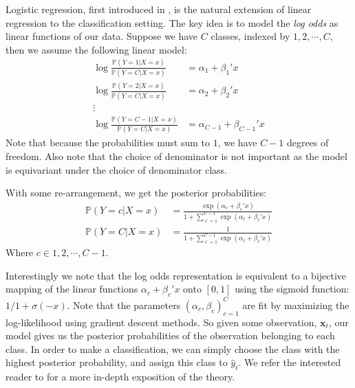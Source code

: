 Logistic regression, first introduced in \cite{COX1958}, is the natural extension of linear regression to the classification setting.
The key idea is to model the \textit{log odds} as linear functions of our data.
Suppose we have $C$ classes, indexed by $1, 2, \cdots, C$, then we assume the following linear model: 
\begin{align*}
    \log \frac{\mathbb{P}(Y=1 | X = x)}{\mathbb{P}(Y=C | X = x)} &= \alpha_1 + \beta_1' x \\
   \log \frac{\mathbb{P}(Y=2 | X = x)}{\mathbb{P}(Y=C | X = x)} &= \alpha_2 + \beta_2' x \\
   \vdots \\
   \log \frac{\mathbb{P}(Y=C-1 | X = x)}{\mathbb{P}(Y=C | X = x)} &= \alpha_{C-1} + \beta_{C-1}' x
\end{align*}
Note that because the probabilities must sum to $1$, we have $C-1$ degrees of freedom.
Also note that the choice of denominator is not important as the model is equivariant
under the choice of denominator class.

With some re-arrangement, we get the posterior probabilities:
\begin{align*}
    \mathbb{P}(Y=c | X = x) &= \frac{\exp(\alpha_c + \beta_c' x)}{1 + \sum_{\ell=1}^{C-1} \exp(\alpha_{\ell} + \beta_{\ell}'x)} \\
    \mathbb{P}(Y=C | X = x) &= \frac{1}{1 + \sum_{\ell=1}^{C-1} \exp(\alpha_{\ell} + \beta_{\ell}'x)}
\end{align*}
Where  $c \in {1, 2, \cdots, C-1}.$

Interestingly we note that the log odds representation is equivalent to a bijective mapping of the linear functions $\alpha_c + \beta_c'x$ onto $[0, 1]$ using
the sigmoid function: $1 / 1 + \sigma(-x)$.
Note that the parameters $(\alpha_c, \beta_c)_{c=1}^C$ are fit by maximizing the log-likelihood using gradient descent methods.
So given some observation, $\bm{x}_t$, our model gives us the posterior probabilities of the observation
belonging to each class. In order to make a classification, we can simply choose the class with the highest
posterior probability, and assign this class to $\hat{y}_t$.
We refer the interested reader to \cite{HASTIE2001} for a more in-depth exposition of the theory.

